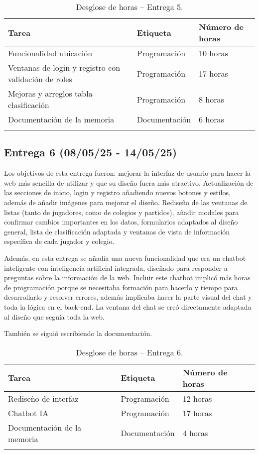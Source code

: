 \begin{longtable}{@{} p{6cm} p{3cm} p{3cm} @{}}
  \toprule
  \rowcolor{gray!20}
  Tarea & Etiqueta & Número de horas \\ 
  \midrule
  \endhead
  Funcionalidad ubicación  & Programación  & 10 horas \\ 
  \midrule

  Ventanas de login y registro con validación de roles  &  Programación  &  17 horas \\ 
  \midrule

  Mejoras y arreglos tabla clasificación  & Programación  & 8 horas \\ 
  \midrule

  Documentación de la memoria & Documentación  & 6 horas \\ 
  \midrule

  \bottomrule
  \caption{Desglose de horas -- Entrega 5.}
\end{longtable}


\subsection{Entrega 6 (08/05/25 - 14/05/25)}

Los objetivos de esta entrega fueron: mejorar la interfaz de usuario para hacer la web más sencilla de utilizar y que su diseño fuera más atractivo. Actualización de las secciones de inicio, login y registro añadiendo nuevos botones y estilos, además de añadir imágenes para mejorar el diseño. Rediseño de las ventanas de listas (tanto de jugadores, como de colegios y partidos), añadir modales para confirmar cambios importantes en los datos, formularios adaptados al diseño general, lista de clasificación adaptada y ventanas de vista de información específica de cada jugador y colegio.

Además, en esta entrega se añadía una nueva funcionalidad que era un chatbot inteligente con inteligencia artificial integrada, diseñado para responder a preguntas sobre la información de la web. Incluir este chatbot implicó más horas de programación porque se necesitaba formación para hacerlo y tiempo para desarrollarlo y resolver errores, además implicaba hacer la parte visual del chat y toda la lógica en el back-end. La ventana del chat se creó directamente adaptada al diseño que seguía toda la web.

También se siguió escribiendo la documentación.

\begin{longtable}{@{} p{6cm} p{3cm} p{3cm} @{}}
  \toprule
  \rowcolor{gray!20}
  Tarea & Etiqueta & Número de horas \\ 
  \midrule
  \endhead
  Rediseño de interfaz  & Programación  & 12 horas \\ 
  \midrule

  Chatbot IA  &  Programación  &  17 horas \\ 
  \midrule

  Documentación de la memoria & Documentación  & 4 horas \\ 
  \midrule

  \bottomrule
  \caption{Desglose de horas -- Entrega 6.}
\end{longtable}

